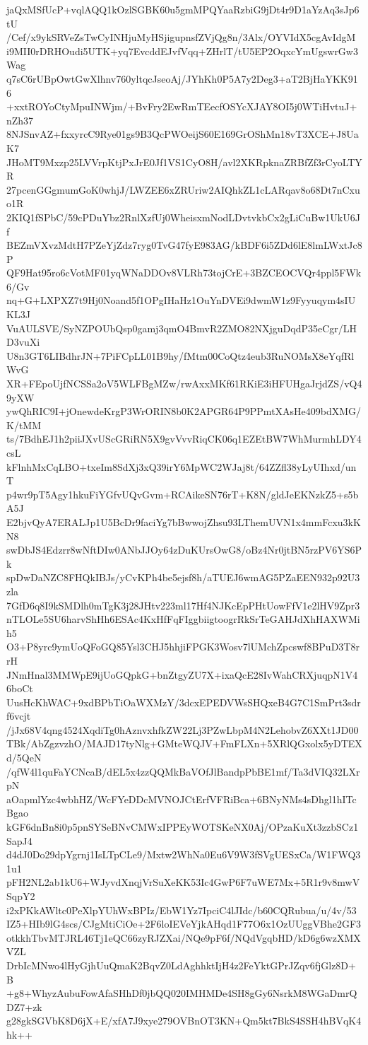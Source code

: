 jaQxMSfUcP+vqlAQQ1kOzlSGBK60u5gmMPQYaaRzbiG9jDt4r9D1aYzAq3sJp6tU
/Cef/x9ykSRVeZsTwCyINHjuMyHSjigupnsfZVjQg8n/3Alx/OYVIdX5cgAvIdgM
i9MII0rDRHOudi5UTK+yq7EvcddEJvfVqq+ZHrlT/tU5EP2OqxcYmUgswrGw3Wag
q7sC6rUBpOwtGwXlhnv760yltqcJseoAj/JYhKh0P5A7y2Deg3+aT2BjHaYKK916
+xxtROYoCtyMpuINWjm/+BvFry2EwRmTEecfOSYcXJAY8OI5j0WTiHvtuJ+nZh37
8NJSnvAZ+fxxyrcC9Rye01gs9B3QcPWOeijS60E169GrOShMn18vT3XCE+J8UaK7
JHoMT9Mxzp25LVVrpKtjPxJrE0Jf1VS1CyO8H/avl2XKRpknaZRBfZf3rCyoLTYR
27pcenGGgmumGoK0whjJ/LWZEE6xZRUriw2AIQhkZL1cLARqav8o68Dt7nCxuo1R
2KIQ1fSPbC/59cPDuYbz2RnlXzfUj0WheisxmNodLDvtvkbCx2gLiCuBw1UkU6Jf
BEZmVXvzMdtH7PZeYjZdz7ryg0TvG47fyE983AG/kBDF6i5ZDd6lE8lmLWxtJc8P
QF9Hat95ro6cVotMF01yqWNaDDOv8VLRh73tojCrE+3BZCEOCVQr4ppl5FWk6/Gv
nq+G+LXPXZ7t9Hj0Noand5f1OPgIHaHz1OuYnDVEi9dwmW1z9Fyyuqym4sIUKL3J
VuAULSVE/SyNZPOUbQsp0gamj3qmO4BmvR2ZMO82NXjguDqdP35eCgr/LHD3vuXi
U8n3GT6LIBdhrJN+7PiFCpLL01B9hy/fMtm00CoQtz4eub3RuNOMsX8eYqfRlWvG
XR+FEpoUjfNCSSa2oV5WLFBgMZw/rwAxxMKf61RKiE3iHFUHgaJrjdZS/vQ49yXW
ywQhRIC9I+jOnewdeKrgP3WrORIN8b0K2APGR64P9PPmtXAsHe409bdXMG/K/tMM
ts/7BdhEJ1h2piiJXvUScGRiRN5X9gvVvvRiqCK06q1EZEtBW7WhMurmhLDY4csL
kFlnhMxCqLBO+txeIm8SdXj3xQ39irY6MpWC2WJaj8t/64ZZfl38yLyUIhxd/unT
p4wr9pT5Agy1hkuFiYGfvUQvGvm+RCAikeSN76rT+K8N/gldJeEKNzkZ5+s5bA5J
E2bjvQyA7ERALJp1U5BcDr9faciYg7bBwwojZhsu93LThemUVN1x4mmFcxu3kKN8
swDbJS4Edzrr8wNftDIw0ANbJJOy64zDuKUrsOwG8/oBz4Nr0jtBN5rzPV6YS6Pk
spDwDaNZC8FHQkIBJs/yCvKPh4be5ejsf8h/aTUEJ6wmAG5PZaEEN932p92U3zla
7GfD6q8I9kSMDlh0mTgK3j28JHtv223ml17Hf4NJKcEpPHtUowFfV1e2lHV9Zpr3
nTLOLe5SU6harvShHh6ESAc4KxHfFqFIggbiigtoogrRkSrTeGAHJdXhHAXWMih5
O3+P8yrc9ymUoQFoGQ85Ysl3CHJ5hhjiFPGK3Wosv7lUMchZpcswf8BPuD3T8rrH
JNmHnal3MMWpE9ijUoGQpkG+bnZtgyZU7X+ixaQcE28IvWahCRXjuqpN1V46boCt
UusHcKhWAC+9xdBPbTiOaWXMzY/3dcxEPEDVWsSHQxeB4G7C1SmPrt3sdrf6vcjt
/jJx68V4qng4524XqdiTg0hAznvxhfkZW22Lj3PZwLbpM4N2LehobvZ6XXt1JD00
TBk/AbZgzvzhO/MAJD17tyNlg+GMteWQJV+FmFLXn+5XRlQGxolx5yDTEXd/5QeN
/qfW4l1quFaYCNcaB/dEL5x4zzQQMkBaVOfJlBandpPbBE1mf/Ta3dVIQ32LXrpN
aOapmlYzc4wbhHZ/WcFYeDDcMVNOJCtErfVFRiBca+6BNyNMs4sDhgl1hITcBgao
kGF6dnBn8i0p5pnSYSeBNvCMWxIPPEyWOTSKeNX0Aj/OPzaKuXt3zzbSCz1SapJ4
d4dJ0Do29dpYgrnj1IsLTpCLe9/Mxtw2WhNa0Eu6V9W3fSVgUESxCa/W1FWQ31u1
pFH2NL2ab1kU6+WJyvdXnqjVrSuXeKK53Ic4GwP6F7uWE7Mx+5R1r9v8mwVSqpY2
i2xPKkAWltc0PeXlpYUhWxBPIz/EbW1Yz7IpciC4lJIdc/b60CQRubua/u/4v/53
IZ5+HIb9lG4scs/CJgMtiCiOe+2F6loIEVeYjkAHqd1F77O6x1OzUUggVBhe2GF3
otkkhTbvMTJRL46Tj1eQC66zyRJZXai/NQe9pF6f/NQdVgqbHD/kD6g6wzXMXVZL
DrbIcMNwo4lHyGjhUuQmaK2BqvZ0LdAghhktIjH4z2FeYktGPrJZqv6fjGlz8D+B
+g8+WhyzAubuFowAfaSHhDf0jbQQ020IMHMDe4SH8gGy6NsrkM8WGaDmrQDZ7+zk
g28gkSGVbK8D6jX+E/xfA7J9xye279OVBnOT3KN+Qm5kt7BkS4SSH4hBVqK4hk++
